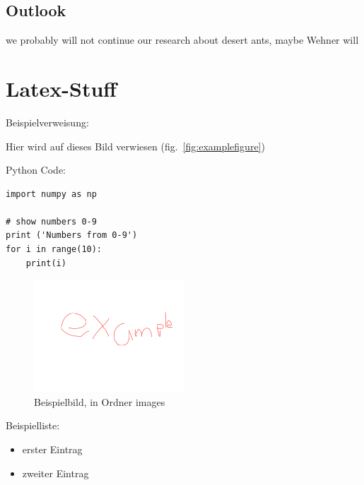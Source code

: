 \documentclass[11pt]{article}
\begin{document}
	\subsection{Outlook}
		we probably will not continue our research about desert ants, maybe Wehner will

\section{Latex-Stuff}

Beispielverweisung:

Hier wird auf dieses Bild verwiesen (fig.~\vref{fig:examplefigure})

Python Code:
\begin{lstlisting}[caption=Python code example]
import numpy as np

# show numbers 0-9
print ('Numbers from 0-9')
for i in range(10):
	print(i)
\end{lstlisting}


\begin{figure}[h!]
	\includegraphics[width=0.5\textwidth]{example.png}
	\caption{Beispielbild, in Ordner images}
	\label{fig:examplefigure}
\end{figure}

Beispielliste:

\begin{itemize}
	\item erster Eintrag
	\item zweiter Eintrag
\end{itemize}
\end{document}
